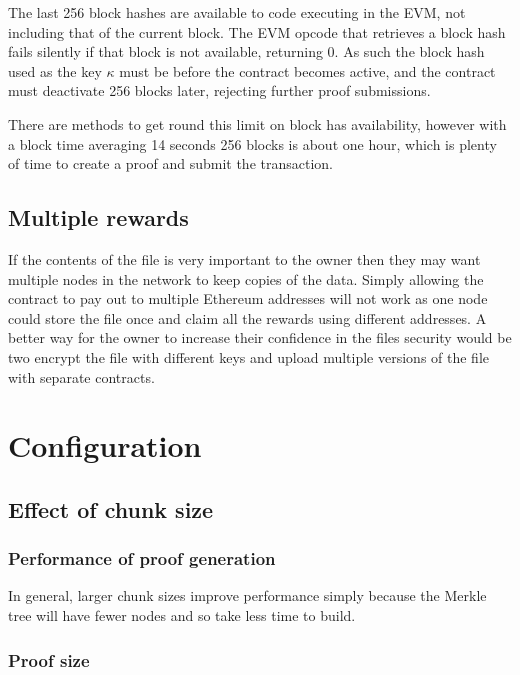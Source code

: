 \documentclass[12pt,a4paper,twoside,openright]{report}
\begin{document}
The last 256 block hashes are available to code executing in the EVM, not including that of the current block.
The EVM opcode that retrieves a block hash fails silently if that block is not available, returning 0.
As such the block hash used as the key $\kappa$ must be before the contract becomes active,
and the contract must deactivate 256 blocks later, rejecting further proof submissions.

There are methods to get round this limit on block has availability, however with a block time averaging 14 seconds
256 blocks is about one hour, which is plenty of time to create a proof and submit the transaction.

\subsection{Multiple rewards}

If the contents of the file is very important to the owner then they may want multiple nodes in the network to keep copies of the data.
Simply allowing the contract to pay out to multiple Ethereum addresses will not work as one node could store the file once and claim all the rewards
using different addresses.
A better way for the owner to increase their confidence in the files security would be two encrypt the file with different keys and
upload multiple versions of the file with separate contracts.

\section{Configuration}

\subsection{Effect of chunk size}

\subsubsection{Performance of proof generation}

In general, larger chunk sizes improve performance simply because the Merkle tree will have fewer nodes and so take less time to build.

\subsubsection{Proof size} \label{chunk-size-proof-size}
\end{document}
